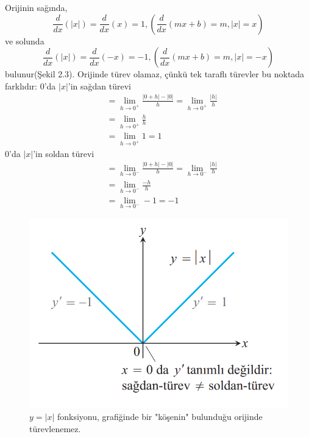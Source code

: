 \begin{cozum} Orijinin sağında,
	\begin{equation*}
		\frac{d}{dx}(|x|) =\frac{d}{dx}(x)=1,
		\left(\frac{d}{dx}(mx+b)=m, |x| = x\right)
	\end{equation*}
ve solunda
	\begin{equation*}
		\frac{d}{dx}(|x|) =\frac{d}{dx}(-x)=-1,
		\left(\frac{d}{dx}(mx+b)=m, |x| = -x\right)
	\end{equation*}
bulunur(Şekil 2.3). Orijinde türev olamaz, çünkü tek taraflı türevler bu noktada farklıdır:
	$0$'da $|x|$'in sağdan türevi
		\begin{equation*}
		\begin{split}
		   & =\lim_{h \rightarrow 0^+}\frac{|0+h|-|0|}{h}=\lim_{h \rightarrow 0^+}\frac{|h|}{h}\\
		   &=  \lim_{h \rightarrow 0^+}\frac{h}{h}\\
		   &=  \lim_{h \rightarrow 0^+}1=1
		\end{split}
		\end{equation*}
	$0$'da $|x|$'in soldan türevi	
		\begin{equation*}
		\begin{split}
		   & =\lim_{h \rightarrow 0^-}\frac{|0+h|-|0|}{h}=\lim_{h \rightarrow 0^-}\frac{|h|}{h}\\
		   &=  \lim_{h \rightarrow 0^-}\frac{-h}{h}\\
		   &=  \lim_{h \rightarrow 0^-}-1=-1
		\end{split}
		\end{equation*}	
\begin{figure}[H]
	\centering
	\includegraphics[width=0.5\linewidth]{mutlakxturev.png}
	\caption{$y=|x|$ fonksiyonu, grafiğinde bir "köşenin" bulunduğu orijinde türevlenemez.}
	\label{fig:ornekresim}
\end{figure}
\end{cozum}
